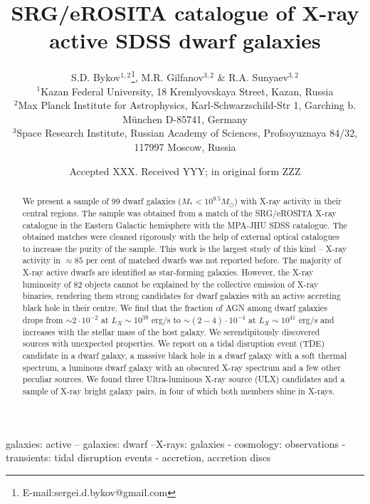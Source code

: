 \documentclass[fleqn,usenatbib]{mnras}
\title[SRG/eROSITA catalogue of active dwarf galaxies]{SRG/eROSITA catalogue of X-ray active SDSS dwarf galaxies}
\author[Bykov, Gilfanov \& Sunyaev]{
S.D. Bykov$^{1,2}$\thanks{E-mail:sergei.d.bykov@gmail.com}, M.R. Gilfanov$^{3,2}$
 \& R.A. Sunyaev$^{3,2}$\\
$^{1}$Kazan Federal University, 18 Kremlyovskaya Street, Kazan, Russia\\
$^{2}$Max Planck Institute for Astrophysics, Karl-Schwarzschild-Str 1, Garching b. München D-85741, Germany\\
$^{3}$Space Research Institute, Russian Academy of Sciences, Profsoyuznaya 84/32, 117997 Moscow, Russia\\
}
\date{Accepted XXX. Received YYY; in original form ZZZ}
\begin{document}
\label{firstpage}
\pagerange{\pageref{firstpage}--\pageref{lastpage}}
\maketitle

\begin{abstract}
We present a sample of 99 dwarf galaxies ($M_*<10^{9.5} M_\odot$) with X-ray activity in their central regions. The sample was obtained from a match of the SRG/eROSITA X-ray catalogue in the Eastern Galactic hemisphere with the MPA-JHU SDSS catalogue. The obtained matches were cleaned rigorously with the help of external optical catalogues to increase the purity of the sample. This work is the largest study of this kind -- X-ray activity in  $\approx 85$ per cent of matched dwarfs was not reported before. The majority of  X-ray active dwarfs are identified as star-forming galaxies. However, the X-ray luminosity of 82 objects cannot be  explained by the collective emission of X-ray binaries, rendering them strong candidates for dwarf galaxies with an active accreting black hole in their centre. We find that the fraction of AGN among dwarf galaxies drops from $\sim 2\cdot 10^{-2}$ at $L_X\sim 10^{39}$ erg/s to $\sim (2-4)\cdot 10^{-4}$ at $L_X\sim 10^{41}$ erg/s and increases with the stellar mass of the host galaxy. We serendipitously discovered sources with unexpected properties. We report on a tidal disruption event (TDE) candidate in a dwarf galaxy, a massive black hole in a dwarf galaxy with a soft thermal spectrum, a luminous dwarf galaxy with an obscured X-ray spectrum and a few other peculiar sources.  We found three Ultra-luminous X-ray source (ULX) candidates and a sample of X-ray bright galaxy pairs, in four of which both members shine in X-rays. 



\end{abstract}

\begin{keywords}
galaxies: active – galaxies: dwarf –X-rays: galaxies - cosmology: observations - transients: tidal disruption events - accretion, accretion discs
\end{keywords}
\end{document}
